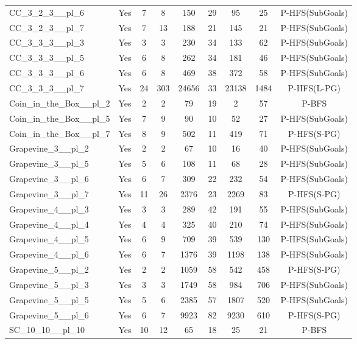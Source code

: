 \documentclass{article}
\begin{document}
\begin{tabular}{lcccccccc}
CC\_3\_2\_3\_\_pl\_6 & Yes & 7 & 8 & 150 & 29 & 95 & 25 & P-HFS(SubGoals) \\
CC\_3\_2\_3\_\_pl\_7 & Yes & 7 & 13 & 188 & 21 & 145 & 21 & P-HFS(SubGoals) \\
CC\_3\_3\_3\_\_pl\_3 & Yes & 3 & 3 & 230 & 34 & 133 & 62 & P-HFS(SubGoals) \\
CC\_3\_3\_3\_\_pl\_5 & Yes & 6 & 8 & 262 & 34 & 181 & 46 & P-HFS(SubGoals) \\
CC\_3\_3\_3\_\_pl\_6 & Yes & 6 & 8 & 469 & 38 & 372 & 58 & P-HFS(SubGoals) \\
CC\_3\_3\_3\_\_pl\_7 & Yes & 24 & 303 & 24656 & 33 & 23138 & 1484 & P-HFS(L-PG) \\
Coin\_in\_the\_Box\_\_pl\_2 & Yes & 2 & 2 & 79 & 19 & 2 & 57 & P-BFS \\
Coin\_in\_the\_Box\_\_pl\_5 & Yes & 7 & 9 & 90 & 10 & 52 & 27 & P-HFS(SubGoals) \\
Coin\_in\_the\_Box\_\_pl\_7 & Yes & 8 & 9 & 502 & 11 & 419 & 71 & P-HFS(S-PG) \\
Grapevine\_3\_\_pl\_2 & Yes & 2 & 2 & 67 & 10 & 16 & 40 & P-HFS(SubGoals) \\
Grapevine\_3\_\_pl\_5 & Yes & 5 & 6 & 108 & 11 & 68 & 28 & P-HFS(SubGoals) \\
Grapevine\_3\_\_pl\_6 & Yes & 6 & 7 & 309 & 22 & 232 & 54 & P-HFS(SubGoals) \\
Grapevine\_3\_\_pl\_7 & Yes & 11 & 26 & 2376 & 23 & 2269 & 83 & P-HFS(S-PG) \\
Grapevine\_4\_\_pl\_3 & Yes & 3 & 3 & 289 & 42 & 191 & 55 & P-HFS(SubGoals) \\
Grapevine\_4\_\_pl\_4 & Yes & 4 & 4 & 325 & 40 & 210 & 74 & P-HFS(SubGoals) \\
Grapevine\_4\_\_pl\_5 & Yes & 6 & 9 & 709 & 39 & 539 & 130 & P-HFS(SubGoals) \\
Grapevine\_4\_\_pl\_6 & Yes & 6 & 7 & 1376 & 39 & 1198 & 138 & P-HFS(SubGoals) \\
Grapevine\_5\_\_pl\_2 & Yes & 2 & 2 & 1059 & 58 & 542 & 458 & P-HFS(S-PG) \\
Grapevine\_5\_\_pl\_3 & Yes & 3 & 3 & 1749 & 58 & 984 & 706 & P-HFS(SubGoals) \\
Grapevine\_5\_\_pl\_5 & Yes & 5 & 6 & 2385 & 57 & 1807 & 520 & P-HFS(SubGoals) \\
Grapevine\_5\_\_pl\_6 & Yes & 6 & 7 & 9923 & 82 & 9230 & 610 & P-HFS(S-PG) \\
SC\_10\_10\_\_pl\_10 & Yes & 10 & 12 & 65 & 18 & 25 & 21 & P-BFS \\

\end{tabular}
\end{document}
